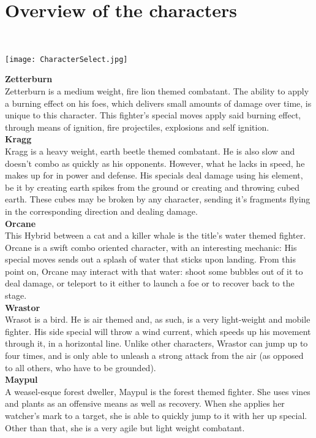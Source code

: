 \documentclass{article}
\begin{document}
\newpage

\chapter{\textbf{Overview of the characters}}\\

\begin{center}
\texttt{[image: CharacterSelect.jpg]}
\end{center}

\textbf{Zetterburn}\\
Zetterburn is a medium weight, fire lion themed combatant. The ability to apply a burning effect on his foes, which delivers small amounts of damage over time, is unique to this character. This fighter's special moves apply said burning effect, through means of ignition, fire projectiles, explosions and self ignition.\\
\textbf{Kragg}\\
Kragg is a heavy weight, earth beetle themed combatant. He is also slow and doesn't combo as quickly as his opponents. However, what he lacks in speed, he makes up for in power and defense. His specials deal damage using his element, be it by creating earth spikes from the ground or creating and throwing cubed earth. These cubes may be broken by any character, sending it's fragments flying in the corresponding direction and dealing damage.\\
\textbf{Orcane}\\
This Hybrid between a cat and a killer whale is the title's water themed fighter. Orcane is a swift combo oriented character, with an interesting mechanic: His special moves sends out a splash of water that sticks upon landing. From this point on, Orcane may interact with that water: shoot some bubbles out of it to deal damage, or teleport to it either to launch a foe or to recover back to the stage.\\
\textbf{Wrastor}\\
Wrasot is a bird. He is air themed and, as such, is a very light-weight and mobile fighter. His side special will throw a wind current, which speeds up his movement through it, in a horizontal line. Unlike other characters, Wrastor can jump up to four times, and is only able to unleash a strong attack from the air (as opposed to all others, who have to be grounded).
\\
\textbf{Maypul}\\
A weasel-esque forest dweller, Maypul is the forest themed fighter. She uses vines and plants as an offensive means as well as recovery. When she applies her watcher's mark to a target, she is able to quickly jump to it with her up special. Other than that, she is a very agile but light weight combatant.
\end{document}
